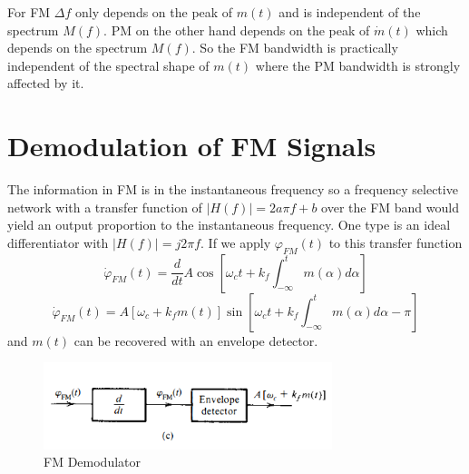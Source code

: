 \documentclass{article}
\begin{document}
    For FM $\Delta f$ only depends on the peak of $m(t)$ and is independent of the spectrum $M(f)$. PM on the other hand depends on the peak of 
    $\dot{m}(t)$ which depends on the spectrum $M(f)$. So the FM bandwidth is practically independent of the spectral shape of $m(t)$ where the PM 
    bandwidth is strongly affected by it.

    \section{Demodulation of FM Signals}
    The information in FM is in the instantaneous frequency so a frequency selective network with a transfer function of $|H(f)| = 2a\pi f + b$
    over the FM band would yield an output proportion to the instantaneous frequency. One type is an ideal differentiator with $|H(f)| = j2\pi f$.
    If we apply $\varphi_{FM}(t)$ to this transfer function
    \begin{equation}
        \dot{\varphi}_{FM}(t) = \frac{d}{dt}{A\cos[\omega_ct +k_f\int_{-\infty}^{t}m(\alpha)d\alpha]}
    \end{equation}
    \begin{equation}
        \dot{\varphi}_{FM}(t) = A[\omega_c + k_fm(t)]\sin[\omega_ct +k_f\int_{-\infty}^{t}m(\alpha)d\alpha - \pi]
    \end{equation}
    and $m(t)$ can be recovered with an envelope detector. 

    \begin{figure}[h]
        \centering
        \includegraphics[width=0.75\textwidth]{fm_demod}
        \caption{FM Demodulator}
    \end{figure}
\end{document}
